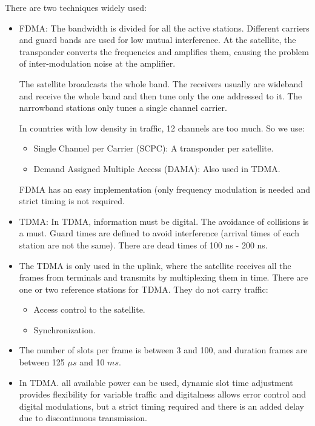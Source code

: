 \documentclass[../main.tex]{subfiles}
\begin{document}
There are two techniques widely used:
\begin{itemize}
	\item {
		FDMA: The bandwidth is divided for all the active stations. Different carriers and guard bands are used for low mutual interference. At the satellite, the transponder converts the frequencies and amplifies them, causing the problem of inter-modulation noise at the amplifier.

		The satellite broadcasts the whole band. The receivers usually are wideband and receive the whole band and then tune only the one addressed to it. The narrowband stations only tunes a single channel carrier.

		In countries with low density in traffic, 12 channels are too much. So we use:
		\begin{itemize}
			\item Single Channel per Carrier (SCPC): A transponder per satellite.
			\item Demand Assigned Multiple Access (DAMA): Also used in TDMA.
		\end{itemize}

		FDMA has an easy implementation (only frequency modulation is needed and strict timing is not required.
	}
	\item TDMA: In TDMA, information must be digital. The avoidance of collisions is a must. Guard times are defined to avoid interference (arrival times of each station are not the same). There are dead times of 100 ns - 200 ns.
	\item {
		The TDMA is only used in the uplink, where the satellite receives all the frames from terminals and transmits by multiplexing them in time. There are one or two reference stations for TDMA. They do not carry traffic:
		\begin{itemize}
			\item Access control to the satellite.
			\item Synchronization.
		\end{itemize}
	}
	\item The number of slots per frame is between 3 and 100, and duration frames are between 125 $\mu s$ and 10 $ms$.
	\item In TDMA. all available power can be used, dynamic slot time adjustment provides flexibility for variable traffic and digitalness allows error control and digital modulations, but a strict timing required and there is an added delay due to discontinuous transmission.
\end{itemize}
\end{document}
